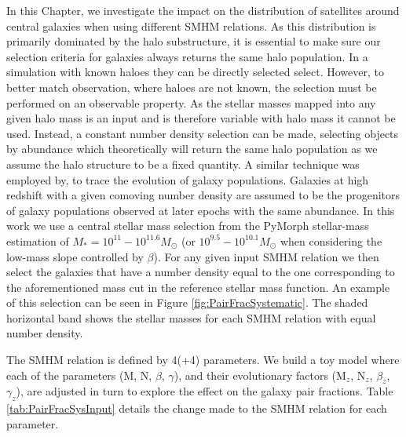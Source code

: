 In this Chapter, we investigate the impact on the distribution of satellites around central galaxies when using different SMHM relations. 
As this distribution is primarily dominated by the halo substructure, it is essential to make sure our selection criteria for galaxies always returns the same halo population. 
In a simulation with known haloes they can be directly selected select. However, to better match observation, where haloes are not known, the selection must be performed on an observable property.
As the stellar masses mapped into any given halo mass is an input and is therefore variable with halo mass it cannot be used. 
Instead, a constant number density selection can be made, selecting objects by abundance which theoretically will return the same halo population as we assume the halo structure to be a fixed quantity.
A similar technique was employed by, \citet[e.g.][]{vanDokkum2013The2.5, Huertas-Company2016MassCANDELS, Leja2013TRACINGSELECTION, Mundy2015Tracing3} to trace the evolution of galaxy populations. Galaxies at high redshift with a given comoving number density are assumed to be the progenitors of galaxy populations observed at later epochs with the same abundance. 
In this work we use a central stellar mass selection from the PyMorph stellar-mass estimation of $M_{*} = 10^{11} - 10^{11.6} M_{\odot}$ (or $10^{9.5} - 10^{10.1} M_{\odot}$ when considering the low-mass slope controlled by $\beta$). For any given input SMHM relation we then select the galaxies that have a number density equal to the one corresponding to the aforementioned mass cut in the reference stellar mass function.
An example of this selection can be seen in Figure \ref{fig:PairFracSystematic}.
The shaded horizontal band shows the stellar masses for each SMHM relation with equal number density.

The SMHM relation is defined by 4(+4) parameters. We build a toy model where each of the parameters (M, N, $\beta$, $\gamma$), and their evolutionary factors (M$_z$, N$_z$, $\beta_z$, $\gamma_z$), are adjusted in turn to explore the effect on the galaxy pair fractions. Table \ref{tab:PairFracSysInput} details the change made to the SMHM relation for each parameter. 

